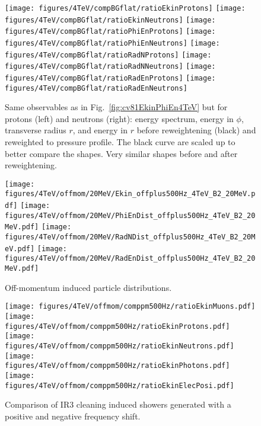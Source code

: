 \begin{figure}
\begin{center}
  \texttt{[image: figures/4TeV/compBGflat/ratioEkinProtons]}
  \texttt{[image: figures/4TeV/compBGflat/ratioEkinNeutrons]}
  \texttt{[image: figures/4TeV/compBGflat/ratioPhiEnProtons]}
  \texttt{[image: figures/4TeV/compBGflat/ratioPhiEnNeutrons]}
  \texttt{[image: figures/4TeV/compBGflat/ratioRadNProtons]}
  \texttt{[image: figures/4TeV/compBGflat/ratioRadNNeutrons]}
  \texttt{[image: figures/4TeV/compBGflat/ratioRadEnProtons]}
  \texttt{[image: figures/4TeV/compBGflat/ratioRadEnNeutrons]}
\end{center}
\vspace{-0.6cm}
 \caption{Same observables as in Fig.~\ref{fig:cv81EkinPhiEn4TeV} but for protons (left) and neutrons (right): energy spectrum, energy in $\phi$, transverse radius $r$, and energy in $r$ before reweightening (black) and reweighted to pressure profile. The black curve are scaled up to better compare the shapes. Very similar shapes before and after reweightening.
   \label{fig:cv81ProtNeut4TeV}}
\end{figure}



\begin{figure}
  \begin{center}
    \texttt{[image: figures/4TeV/offmom/20MeV/Ekin\_offplus500Hz\_4TeV\_B2\_20MeV.pdf]}
    \texttt{[image: figures/4TeV/offmom/20MeV/PhiEnDist\_offplus500Hz\_4TeV\_B2\_20MeV.pdf]}
  \texttt{[image: figures/4TeV/offmom/20MeV/RadNDist\_offplus500Hz\_4TeV\_B2\_20MeV.pdf]}
  \texttt{[image: figures/4TeV/offmom/20MeV/RadEnDist\_offplus500Hz\_4TeV\_B2\_20MeV.pdf]}

\end{center}
\vspace{-0.6cm}
 \caption{Off-momentum induced particle distributions.
  \label{offmom4TeV2}}
\end{figure}




\begin{figure}%
\begin{center}
  \texttt{[image: figures/4TeV/offmom/comppm500Hz/ratioEkinMuons.pdf]}
  \texttt{[image: figures/4TeV/offmom/comppm500Hz/ratioEkinProtons.pdf]}
  \texttt{[image: figures/4TeV/offmom/comppm500Hz/ratioEkinNeutrons.pdf]}
  \texttt{[image: figures/4TeV/offmom/comppm500Hz/ratioEkinPhotons.pdf]}
  \texttt{[image: figures/4TeV/offmom/comppm500Hz/ratioEkinElecPosi.pdf]}
\end{center}
\vspace{-0.6cm}
 \caption{Comparison of IR3 cleaning induced showers generated with a positive and negative frequency shift.
  \label{compPM_ekin}}
\end{figure}

